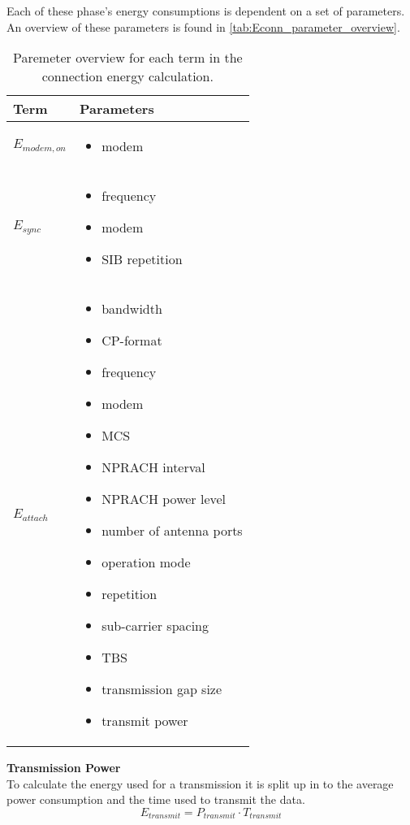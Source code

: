 Each of these phase's energy consumptions is dependent on a set of parameters. An overview of these parameters is found in \autoref{tab:Econn_parameter_overview}.

\begin{table}[H]
\centering
\begin{tabular}{|m{3cm}|m{6cm}|} \hline
\textbf{Term} & \textbf{Parameters} \\ \hline
$E_{modem,on}$ & \begin{itemize} 
\item modem
\end{itemize} \\ \hline
$E_{sync}$ & \begin{itemize}
\item frequency
\item modem
\item SIB repetition
\end{itemize} \\ \hline
$E_{attach}$ & \begin{itemize}
\item bandwidth
\item \gls{CP}-format
\item frequency
\item modem 
\item \gls{MCS}
\item NPRACH interval
\item NPRACH power level
\item number of antenna ports
\item operation mode
\item repetition
\item sub-carrier spacing
\item \gls{TBS}
\item transmission gap size
\item transmit power
\end{itemize} \\ \hline
\end{tabular}
\caption{Paremeter overview for each term in the connection energy calculation.}
\label{tab:Econn_parameter_overview}
\end{table}



\textbf{Transmission Power}\\
To calculate the energy used for a transmission it is split up in to the average power consumption and the time used to transmit the data. 
\begin{equation}
E_{transmit} = P_{transmit}\cdot T_{transmit}
\end{equation}
\begin{where}
\end{where}

